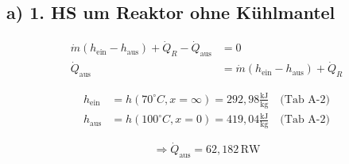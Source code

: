 \subsection*{a) 1. HS um Reaktor ohne Kühlmantel}

\begin{align*}
\dot{m} (h_{\text{ein}} - h_{\text{aus}}) + \dot{Q}_R - \dot{Q}_{\text{aus}} &= 0 \\
\dot{Q}_{\text{aus}} &= \dot{m} (h_{\text{ein}} - h_{\text{aus}}) + \dot{Q}_R
\end{align*}

\begin{align*}
h_{\text{ein}} &= h(70^\circ C, x = \infty) = 292{,}98 \frac{\text{kJ}}{\text{kg}} \quad \text{(Tab A-2)} \\
h_{\text{aus}} &= h(100^\circ C, x = 0) = 419{,}04 \frac{\text{kJ}}{\text{kg}} \quad \text{(Tab A-2)}
\end{align*}

\[
\Rightarrow \dot{Q}_{\text{aus}} = 62{,}182 \, \text{RW}
\]